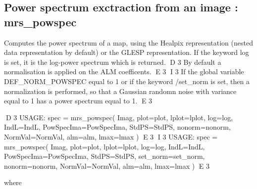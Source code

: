 \subsection{Power spectrum exctraction from an image : mrs\_powspec}
Computes the power spectrum of a map, using the Healpix representation (nested data representation by default) 
or the GLESP representation. If the keyword log is set, it is the log-power spectrum which is returned. 
D 3
By default a normalisation is applied on the ALM coefficents.
E 3
I 3
If the global variable DEF\_NORM\_POWSPEC equal to 1 or if the keyword /set\_norm is set, then a normalization is 
performed, so that a Gaussian randomn noise with variance equal to 1 has a power spectrum equal to 1.
E 3
{\bf
\begin{center}
D 3
     USAGE: spec = mrs\_powspec( Imag, plot=plot, lplot=lplot, log=log, IndL=IndL, PowSpecIma=PowSpecIma, StdPS=StdPS, nonorm=nonorm, NormVal=NormVal, alm=alm, lmax=lmax )
E 3
I 3
     USAGE: spec = mrs\_powspec( Imag, plot=plot, lplot=lplot, log=log, IndL=IndL, PowSpecIma=PowSpecIma, StdPS=StdPS, set\_norm=set\_norm, nonorm=nonorm, NormVal=NormVal, alm=alm, lmax=lmax )
E 3
\end{center}}
where
